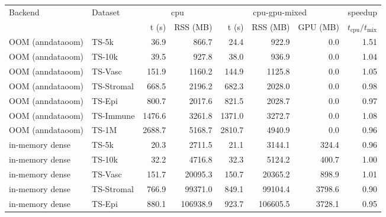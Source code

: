 \begin{tabular}{llrrrrrr}
\toprule
Backend & Dataset & \multicolumn{2}{c}{cpu} & \multicolumn{3}{c}{cpu-gpu-mixed} & speedup \\
& & t (s) & RSS (MB) & t (s) & RSS (MB) & GPU (MB) & $t_{\mathrm{cpu}}/t_{\mathrm{mix}}$ \\
\midrule
OOM (anndataoom) & TS-5k & 36.9 & 866.7 & 24.4 & 922.9 & 0.0 & 1.51 \\
OOM (anndataoom) & TS-10k & 39.5 & 927.8 & 38.0 & 936.9 & 0.0 & 1.04 \\
OOM (anndataoom) & TS-Vasc & 151.9 & 1160.2 & 144.9 & 1125.8 & 0.0 & 1.05 \\
OOM (anndataoom) & TS-Stromal & 668.5 & 2196.2 & 682.3 & 2028.0 & 0.0 & 0.98 \\
OOM (anndataoom) & TS-Epi & 800.7 & 2017.6 & 821.5 & 2028.7 & 0.0 & 0.97 \\
OOM (anndataoom) & TS-Immune & 1476.6 & 3261.8 & 1371.0 & 3272.7 & 0.0 & 1.08 \\
OOM (anndataoom) & TS-1M & 2688.7 & 5168.7 & 2810.7 & 4940.9 & 0.0 & 0.96 \\
in-memory dense & TS-5k & 20.3 & 2711.5 & 21.1 & 3144.1 & 324.4 & 0.96 \\
in-memory dense & TS-10k & 32.2 & 4716.8 & 32.3 & 5124.2 & 400.7 & 1.00 \\
in-memory dense & TS-Vasc & 151.7 & 20095.3 & 150.7 & 20365.2 & 898.9 & 1.01 \\
in-memory dense & TS-Stromal & 766.9 & 99371.0 & 849.1 & 99104.4 & 3798.6 & 0.90 \\
in-memory dense & TS-Epi & 880.1 & 106938.9 & 923.7 & 106605.5 & 3728.1 & 0.95 \\
\bottomrule
\end{tabular}